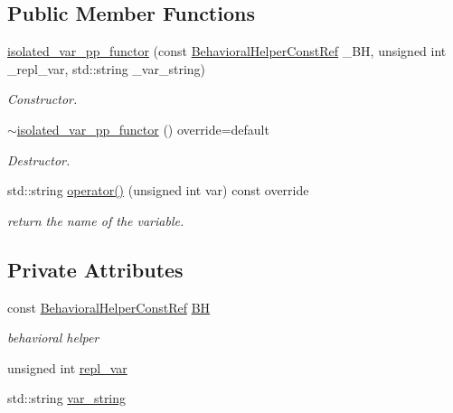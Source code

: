 \subsection*{Public Member Functions}
\begin{DoxyCompactItemize}
\item 
\hyperlink{structisolated__var__pp__functor_afd257edce29dd2262d00f33a1e13e27c}{isolated\+\_\+var\+\_\+pp\+\_\+functor} (const \hyperlink{behavioral__helper_8hpp_aae973b54cac87eef3b27442aa3e1e425}{Behavioral\+Helper\+Const\+Ref} \+\_\+\+BH, unsigned int \+\_\+repl\+\_\+var, std\+::string \+\_\+var\+\_\+string)
\begin{DoxyCompactList}\small\item\em Constructor. \end{DoxyCompactList}\item 
\hyperlink{structisolated__var__pp__functor_a7f0d00957cff6f3d03b72d712bffde9c}{$\sim$isolated\+\_\+var\+\_\+pp\+\_\+functor} () override=default
\begin{DoxyCompactList}\small\item\em Destructor. \end{DoxyCompactList}\item 
std\+::string \hyperlink{structisolated__var__pp__functor_a2597699d66d8b51c9faa06d0be2e1f43}{operator()} (unsigned int var) const override
\begin{DoxyCompactList}\small\item\em return the name of the variable. \end{DoxyCompactList}\end{DoxyCompactItemize}
\subsection*{Private Attributes}
\begin{DoxyCompactItemize}
\item 
const \hyperlink{behavioral__helper_8hpp_aae973b54cac87eef3b27442aa3e1e425}{Behavioral\+Helper\+Const\+Ref} \hyperlink{structisolated__var__pp__functor_ad53cd26c4a886ded9d6fb5b399db35d6}{BH}
\begin{DoxyCompactList}\small\item\em behavioral helper \end{DoxyCompactList}\item 
unsigned int \hyperlink{structisolated__var__pp__functor_aa595922ad5c226e80aed24c3d786cb25}{repl\+\_\+var}
\item 
std\+::string \hyperlink{structisolated__var__pp__functor_a2c1ee59b62b8c4368d2e8ebdf5b98ffb}{var\+\_\+string}
\end{DoxyCompactItemize}


